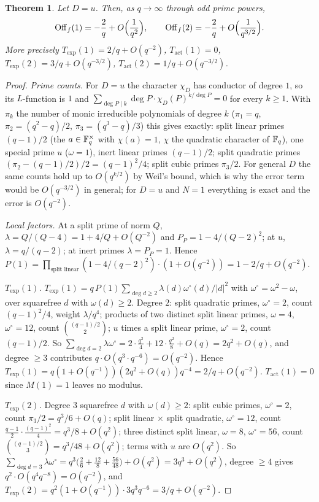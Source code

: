 \documentclass[11pt,a4paper]{article}
\newtheorem{theorem}{Theorem}
\theoremstyle{remark}\newtheorem{remark}[theorem]{Remark}
\newcommand{\Off}{\mathrm{Off}}\newcommand{\e}{\mathrm{e}}
\begin{document}
\begin{theorem}\label{thm:B}
Let $D=u$. Then, as $q\to\infty$ through odd prime powers,
\[
\Off_f(1)=-\frac2q+O\Bigl(\frac1{q^2}\Bigr),\qquad\Off_f(2)=-\frac2q+O\Bigl(\frac1{q^{3/2}}\Bigr).
\]
More precisely $T_{\exp}(1)=2/q+O(q^{-2})$, $T_{\mathrm{act}}(1)=0$, $T_{\exp}(2)=3/q+O(q^{-3/2})$, $T_{\mathrm{act}}(2)=1/q+O(q^{-3/2})$.
\end{theorem}

\begin{proof}
\emph{Prime counts.} For $D=u$ the character $\chi_D$ has conductor of degree $1$, so its $L$-function is $1$ and
$\sum_{\deg P\mid k}\deg P\cdot\chi_D(P)^{k/\deg P}=0$ for every $k\ge1$. With $\pi_k$ the number of monic irreducible
polynomials of degree $k$ ($\pi_1=q$, $\pi_2=(q^2-q)/2$, $\pi_3=(q^3-q)/3$) this gives exactly: split linear primes
$(q-1)/2$ (the $a\in\mathbb{F}_q^\times$ with $\chi(a)=1$, $\chi$ the quadratic character of $\mathbb{F}_q$), one special prime $u$
($\omega=1$), inert linear primes $(q-1)/2$; split quadratic primes $(\pi_2-(q-1)/2)/2=(q-1)^2/4$; split cubic primes
$\pi_3/2$. For general $D$ the same counts hold up to $O(q^{k/2})$ by Weil's bound, which is why the error term
would be $O(q^{-3/2})$ in general; for $D=u$ and $N=1$ everything is exact and the error is $O(q^{-2})$.

\emph{Local factors.} At a split prime of norm $Q$, $\lambda=Q/(Q-4)=1+4/Q+O(Q^{-2})$ and $P_P=1-4/(Q-2)^2$; at $u$,
$\lambda=q/(q-2)$; at inert primes $\lambda=P_P=1$. Hence $P(1)=\prod_{\text{split linear}}(1-4/(q-2)^2)\cdot(1+O(q^{-2}))=1-2/q+O(q^{-2})$.

\emph{$T_{\exp}(1)$.} $T_{\exp}(1)=q\,P(1)\sum_{\deg d\ge2}\lambda(d)\omega^\circ(d)/|d|^2$ with $\omega^\circ=\omega^2-\omega$, over squarefree
$d$ with $\omega(d)\ge2$. Degree $2$: split quadratic primes, $\omega^\circ=2$, count $(q-1)^2/4$, weight $\lambda/q^4$; products of
two distinct split linear primes, $\omega=4$, $\omega^\circ=12$, count $\binom{(q-1)/2}2$; $u$ times a split linear prime,
$\omega^\circ=2$, count $(q-1)/2$. So $\sum_{\deg d=2}\lambda\omega^\circ=2\cdot\frac{q^2}4+12\cdot\frac{q^2}8+O(q)=2q^2+O(q)$, and
degree $\ge3$ contributes $q\cdot O(q^3\cdot q^{-6})=O(q^{-2})$. Hence $T_{\exp}(1)=q(1+O(q^{-1}))(2q^2+O(q))q^{-4}=2/q+O(q^{-2})$.
$T_{\mathrm{act}}(1)=0$ since $M(1)=1$ leaves no modulus.

\emph{$T_{\exp}(2)$.} Degree $3$ squarefree $d$ with $\omega(d)\ge2$: split cubic primes, $\omega^\circ=2$, count $\pi_3/2=q^3/6+O(q)$;
split linear $\times$ split quadratic, $\omega^\circ=12$, count $\frac{q-1}2\cdot\frac{(q-1)^2}4=q^3/8+O(q^2)$; three distinct split
linear, $\omega=8$, $\omega^\circ=56$, count $\binom{(q-1)/2}3=q^3/48+O(q^2)$; terms with $u$ are $O(q^2)$. So
$\sum_{\deg d=3}\lambda\omega^\circ=q^3\bigl(\tfrac26+\tfrac{12}8+\tfrac{56}{48}\bigr)+O(q^2)=3q^3+O(q^2)$, degree $\ge4$ gives
$q^2\cdot O(q^4q^{-8})=O(q^{-2})$, and $T_{\exp}(2)=q^2(1+O(q^{-1}))\cdot3q^3q^{-6}=3/q+O(q^{-2})$.


\end{proof}
\end{document}
